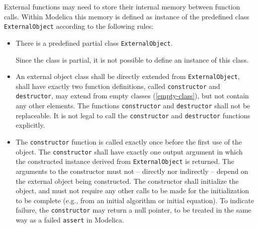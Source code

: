 External functions may need to store their internal memory between function calls.
Within Modelica this memory is defined as instance of the predefined class {\lstinline!ExternalObject!} according to the following rules:
\begin{itemize}
\item
  There is a predefined partial class {\lstinline!ExternalObject!}.
  \begin{nonnormative}
  Since the class is partial, it is not possible to define an instance of this class.
  \end{nonnormative}
\item
  An external object class shall be directly extended from {\lstinline!ExternalObject!}, shall have exactly two function definitions, called {\lstinline!constructor!} and {\lstinline!destructor!}, may extend from empty classes (\cref{empty-class}), but not contain any other elements.
  The functions {\lstinline!constructor!} and {\lstinline!destructor!} shall not be replaceable.
  It is not legal to call the {\lstinline!constructor!} and {\lstinline!destructor!} functions explicitly.
\item
  The {\lstinline!constructor!} function is called exactly once before the first use of the object.
  The {\lstinline!constructor!} shall have exactly one output argument in which the constructed instance derived from {\lstinline!ExternalObject!} is returned.
  The arguments to the constructor must not -- directly nor indirectly -- depend on the external object being constructed.
  The constructor shall initialize the object, and must not require any other calls to be made for the initialization to be complete (e.g., from an initial algorithm or initial equation).
  To indicate failure, the \lstinline!constructor! may return a null pointer, to be treated in the same way as a failed \lstinline!assert! in Modelica.


\end{itemize}
